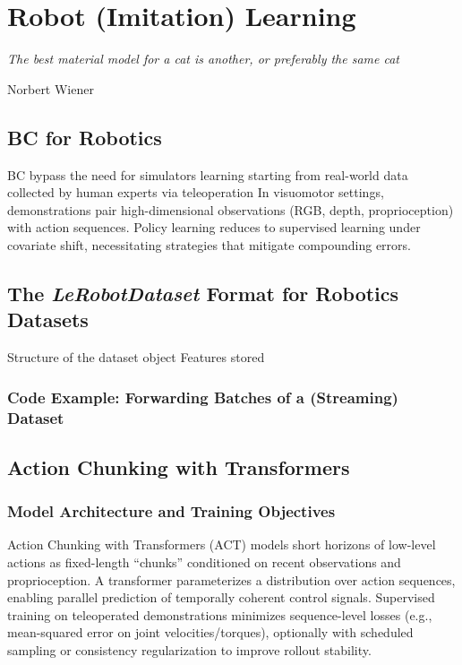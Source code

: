 \section{Robot (Imitation) Learning}
\label{sec:learning-bc-single}

\epigraph{\emph{The best material model for a cat is another, or preferably the same cat}}{Norbert Wiener}


\subsection{BC for Robotics}
BC bypass the need for simulators learning starting from real-world data collected by human experts via teleoperation
In visuomotor settings, demonstrations pair high-dimensional observations (RGB, depth, proprioception) with action sequences. 
Policy learning reduces to supervised learning under covariate shift, necessitating strategies that mitigate compounding errors.

\subsection{The \textit{LeRobotDataset} Format for Robotics Datasets}
Structure of the dataset object
Features stored

\subsubsection{Code Example: Forwarding Batches of a (Streaming) Dataset}

\subsection{Action Chunking with Transformers}
\subsubsection{Model Architecture and Training Objectives}
Action Chunking with Transformers (ACT) models short horizons of low-level actions as fixed-length ``chunks'' conditioned on recent observations and proprioception. A transformer parameterizes a distribution over action sequences, enabling parallel prediction of temporally coherent control signals. Supervised training on teleoperated demonstrations minimizes sequence-level losses (e.g., mean-squared error on joint velocities/torques), optionally with scheduled sampling or consistency regularization to improve rollout stability.

